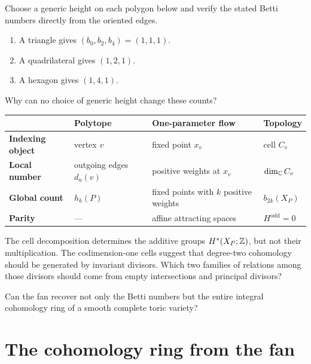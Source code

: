 \begin{pauseandthink}
Choose a generic height on each polygon below and verify the stated
Betti numbers directly from the oriented edges.
\begin{enumerate}
\item A triangle gives \((b_0,b_2,b_4)=(1,1,1)\).
\item A quadrilateral gives \((1,2,1)\).
\item A hexagon gives \((1,4,1)\).
\end{enumerate}
Why can no choice of generic height change these counts?
\end{pauseandthink}

\begin{threedictionaries}
\begin{center}
\begin{tabularx}{\textwidth}{>{\bfseries}lXXX}
\toprule
& Polytope & One-parameter flow & Topology \\
\midrule
Indexing object
& vertex \(v\)
& fixed point \(x_v\)
& cell \(C_v\)
\\
Local number
& outgoing edges \(d_u(v)\)
& positive weights at \(x_v\)
& \(\dim_{\mathbb{C}}C_v\)
\\
Global count
& \(h_k(P)\)
& fixed points with \(k\) positive weights
& \(b_{2k}(X_P)\)
\\
Parity
& ---
& affine attracting spaces
& \(H^{\mathrm{odd}}=0\)
\\
\bottomrule
\end{tabularx}
\end{center}
\end{threedictionaries}

\begin{prediction}
The cell decomposition determines the additive groups
\(H^*(X_P;\mathbb{Z})\), but not their multiplication. The codimension-one
cells suggest that degree-two cohomology should be generated by
invariant divisors. Which two families of relations among those divisors
should come from empty intersections and principal divisors?
\end{prediction}

\begin{guidingquestion}
Can the fan recover not only the Betti numbers but the entire integral
cohomology ring of a smooth complete toric variety?
\end{guidingquestion}

\section{The cohomology ring from the fan}
\label{sec:cohomology-ring-from-fan}

